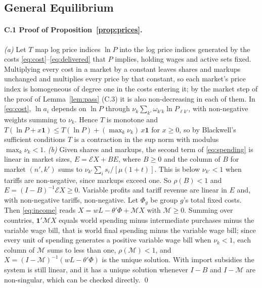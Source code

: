 \documentclass[11pt]{article}
\theoremstyle{definition}
\theoremstyle{remark}
\begin{document}
\subsection{General Equilibrium}
\label{app:ge}

\paragraph{C.1 Proof of Proposition~\ref{prop:prices}.} \emph{(a)} Let $T$ map log price
indices $\ln P$ into the log price indices generated by the costs
\eqref{eq:cost}--\eqref{eq:delivered} that $P$ implies, holding wages and active sets
fixed. Multiplying every cost in a market by a constant leaves shares and markups
unchanged and multiplies every price by that constant, so each market's price index is
homogeneous of degree one in the costs entering it; by the market step of the proof
of Lemma~\ref{lem:pass} (C.3) it is also non-decreasing in each of them. In \eqref{eq:cost}, $\ln a_i$ depends on
$\ln P$ through $\nu_k\sum_{k'}\omega_{k'k}\ln P_{\ell k'}$, with non-negative weights
summing to $\nu_k$. Hence $T$ is monotone and
$T(\ln P+x\mathbf 1)\le T(\ln P)+(\max_k\nu_k)\,x\mathbf 1$ for $x\ge0$, so by
Blackwell's sufficient conditions $T$ is a contraction in the sup norm with modulus
$\max_k\nu_k<1$. \emph{(b)} Given shares and markups, the second term of
\eqref{eq:spending} is linear in market sizes, $E=\mathcal EX+BE$, where $B\ge0$ and
the column of $B$ for market $(n',k')$ sums to $\nu_{k'}\sum_i s_i/[\mu(1+t)]$. This is
below $\nu_{k'}<1$ when tariffs are non-negative, since markups exceed one. So
$\rho(B)<1$ and $E=(I-B)^{-1}\mathcal EX\ge0$. Variable profits and tariff revenue are
linear in $E$ and, with non-negative tariffs, non-negative. Let $\Phi_g$ be group $g$'s
total fixed costs. Then \eqref{eq:income} reads $X=wL-\theta'\Phi+\mathcal MX$ with
$\mathcal M\ge0$. Summing over countries, $\mathbf 1'\mathcal MX$ equals world
spending minus intermediate purchases minus the variable wage bill, that is world final
spending minus the variable wage bill; since every unit of spending generates a positive
variable wage bill when $\nu_k<1$, each column of $\mathcal M$ sums to less than one,
$\rho(\mathcal M)<1$, and $X=(I-\mathcal M)^{-1}(wL-\theta'\Phi)$ is the unique
solution. With import subsidies the system is still linear, and it has a unique
solution whenever $I-B$ and $I-\mathcal M$ are non-singular, which can be checked
directly. \qed
\end{document}
